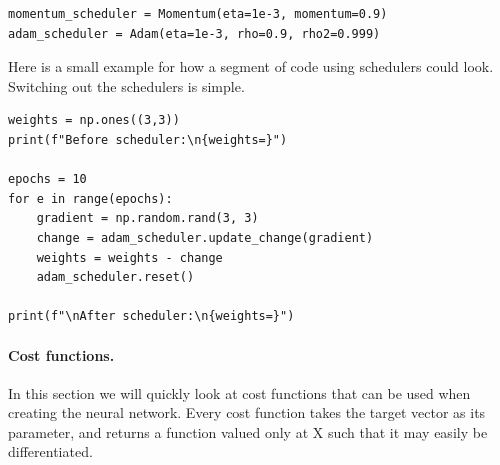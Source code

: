 \documentclass[%
oneside,                 %
final,                   %
10pt]{article}
\begin{document}
\begin{verbatim}
momentum_scheduler = Momentum(eta=1e-3, momentum=0.9)
adam_scheduler = Adam(eta=1e-3, rho=0.9, rho2=0.999)

\end{verbatim}


Here is a small example for how a segment of code using schedulers could look. Switching out the schedulers is simple.













\begin{verbatim}
weights = np.ones((3,3))
print(f"Before scheduler:\n{weights=}")

epochs = 10
for e in range(epochs):
    gradient = np.random.rand(3, 3)
    change = adam_scheduler.update_change(gradient)
    weights = weights - change
    adam_scheduler.reset()

print(f"\nAfter scheduler:\n{weights=}")

\end{verbatim}


\paragraph{Cost functions.}
In this section we will quickly look at cost functions that can be
used when creating the neural network. Every cost function takes the
target vector as its parameter, and returns a function valued only at
X such that it may easily be differentiated.
\end{document}
